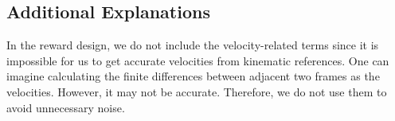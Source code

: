 









\subsection{Additional Explanations} \label{sec:supp_method_additional_details}

In the reward design, we do not include the velocity-related terms since it is impossible for us to get accurate velocities from kinematic references. One can imagine calculating the finite differences between adjacent two frames as the velocities. However, it may not be accurate. Therefore, we do not use them to avoid unnecessary noise. 


